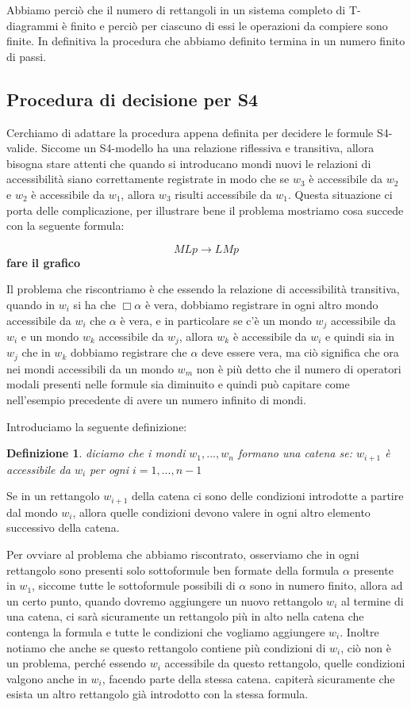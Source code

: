 \documentclass[a4paper, titlepage, 12pt]{report}
\newtheorem{definition}{Definizione}
\begin{document}
Abbiamo perciò che il numero di rettangoli in un sistema completo di T-diagrammi è finito
e perciò per ciascuno di essi le operazioni da compiere sono finite. In definitiva
la procedura che abbiamo definito termina in un numero finito di passi.

\subsection{Procedura di decisione per S4}
Cerchiamo di adattare la procedura appena definita per decidere le formule S4-valide.
Siccome un S4-modello ha una relazione riflessiva e transitiva, allora bisogna stare
attenti che quando si introducano mondi nuovi le relazioni di accessibilità siano
correttamente registrate in modo che se $w_3$ è accessibile da $w_2$ e $w_2$ è accessibile
da $w_1$, allora $w_3$ risulti accessibile da $w_1$.
Questa situazione ci porta delle complicazione, per illustrare bene il problema
mostriamo cosa succede con la seguente formula:

$$MLp \rightarrow LMp$$
\textbf{fare il grafico}

Il problema che riscontriamo è che essendo la relazione di accessibilità transitiva,
quando in $w_i$ si ha che $\Box \alpha$ è vera, dobbiamo registrare in ogni altro mondo
accessibile da $w_i$ che $\alpha$ è vera, e in particolare se c'è un mondo $w_j$
accessibile da $w_i$ e un mondo $w_k$ accessibile da $w_j$, allora $w_k$ è accessibile
da $w_i$ e quindi sia in $w_j$ che in $w_k$ dobbiamo registrare che $\alpha$ deve essere vera,
ma ciò significa che ora nei mondi accessibili da un mondo $w_m$ non è più detto
che il numero di operatori modali presenti nelle formule sia diminuito e quindi
può capitare come nell'esempio precedente di avere un numero infinito di mondi.

Introduciamo la seguente definizione:
\begin{definition}
diciamo che i mondi $w_1, ..., w_n$ formano una catena se:
$w_{i+1}$ è accessibile da $w_i$ per ogni $i = 1, ..., n-1$
\end{definition}

Se in un rettangolo $w_{i+1}$ della catena ci sono delle condizioni introdotte
a partire dal mondo $w_i$, allora quelle condizioni devono valere
in ogni altro elemento successivo della catena.

Per ovviare al problema che abbiamo riscontrato, osserviamo che
in ogni rettangolo sono presenti solo
sottoformule ben formate della formula $\alpha$ presente in $w_1$,
siccome tutte le sottoformule possibili di $\alpha$ sono in numero finito,
allora ad un certo punto, quando dovremo aggiungere un nuovo rettangolo $w_i$
al termine di una catena, ci sarà sicuramente un rettangolo più in alto nella catena
che contenga la formula e tutte le condizioni che vogliamo aggiungere $w_i$.
Inoltre notiamo che anche se questo rettangolo contiene più condizioni di $w_i$,
ciò non è un problema, perché essendo $w_i$ accessibile da questo rettangolo,
quelle condizioni valgono anche in $w_i$, facendo parte della stessa catena.
capiterà sicuramente che esista un altro rettangolo già introdotto
con la stessa formula.
\end{document}
